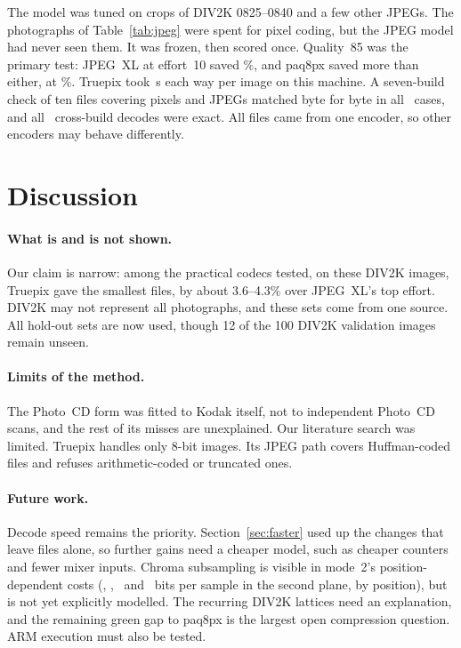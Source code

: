 \documentclass[10pt,twocolumn]{article}
\begin{document}
The model was tuned on crops of DIV2K 0825--0840 and a few other JPEGs. The photographs of Table~\ref{tab:jpeg} were spent for pixel coding, but the JPEG model had never seen them. It was frozen, then scored once. Quality~85 was the primary test: JPEG~XL at effort~10 saved \jptenS\%, and paq8px saved more than either, at \jppaq\%. Truepix took \jpenc\,s each way per image on this machine. A seven-build check of ten files covering pixels and JPEGs matched byte for byte in all \jmfiles\ cases, and all \jmdecodes\ cross-build decodes were exact. All files came from one encoder, so other encoders may behave differently.

\section{Discussion}

\paragraph{What is and is not shown.}
Our claim is narrow: among the practical codecs tested, on these DIV2K images, Truepix gave the smallest files, by about 3.6--4.3\% over JPEG~XL's top effort. DIV2K may not represent all photographs, and these sets come from one source. All hold-out sets are now used, though 12 of the 100 DIV2K validation images remain unseen.

\paragraph{Limits of the method.}
The Photo~CD form was fitted to Kodak itself, not to independent Photo~CD scans, and the rest of its misses are unexplained. Our literature search was limited. Truepix handles only 8-bit images. Its JPEG path covers Huffman-coded files and refuses arithmetic-coded or truncated ones.

\paragraph{Future work.}
Decode speed remains the priority. Section~\ref{sec:faster} used up the changes that leave files alone, so further gains need a cheaper model, such as cheaper counters and fewer mixer inputs. Chroma subsampling is visible in mode~2's position-dependent costs (\plcyA, \plcyB, \plcyC\ and \plcyD\ bits per sample in the second plane, by position), but is not yet explicitly modelled. The recurring DIV2K lattices need an explanation, and the remaining green gap to paq8px is the largest open compression question. ARM execution must also be tested.
\end{document}
